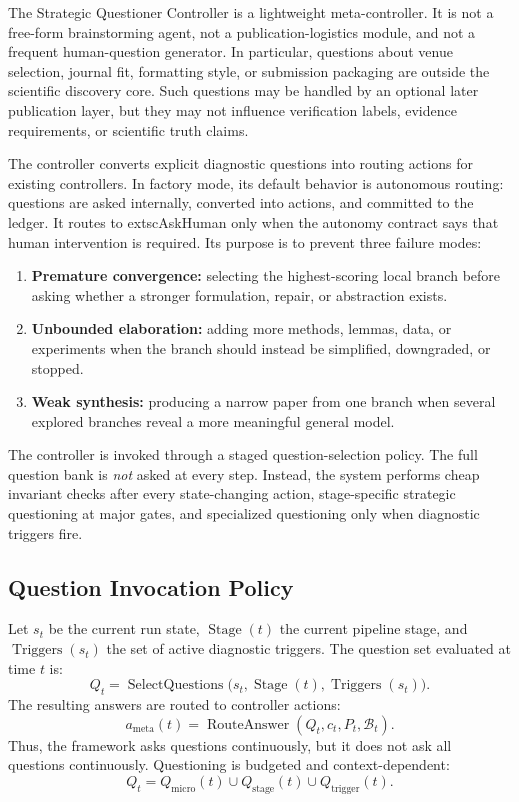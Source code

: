 \documentclass[11pt]{article}
\begin{document}
The Strategic Questioner Controller is a lightweight meta-controller. It is not a free-form brainstorming agent, not a publication-logistics module, and not a frequent human-question generator. In particular, questions about venue selection, journal fit, formatting style, or submission packaging are outside the scientific discovery core. Such questions may be handled by an optional later publication layer, but they may not influence verification labels, evidence requirements, or scientific truth claims.

The controller converts explicit diagnostic questions into routing actions for existing controllers. In factory mode, its default behavior is autonomous routing: questions are asked internally, converted into actions, and committed to the ledger. It routes to 	extsc{AskHuman} only when the autonomy contract says that human intervention is required. Its purpose is to prevent three failure modes:
\begin{enumerate}[leftmargin=*]
    \item \textbf{Premature convergence:} selecting the highest-scoring local branch before asking whether a stronger formulation, repair, or abstraction exists.
    \item \textbf{Unbounded elaboration:} adding more methods, lemmas, data, or experiments when the branch should instead be simplified, downgraded, or stopped.
    \item \textbf{Weak synthesis:} producing a narrow paper from one branch when several explored branches reveal a more meaningful general model.
\end{enumerate}

The controller is invoked through a staged question-selection policy. The full question bank is \emph{not} asked at every step. Instead, the system performs cheap invariant checks after every state-changing action, stage-specific strategic questioning at major gates, and specialized questioning only when diagnostic triggers fire.

\subsection{Question Invocation Policy}

Let $s_t$ be the current run state, $\operatorname{Stage}(t)$ the current pipeline stage, and $\operatorname{Triggers}(s_t)$ the set of active diagnostic triggers. The question set evaluated at time $t$ is:
$$
Q_t = \operatorname{SelectQuestions}\bigl(s_t,\operatorname{Stage}(t),\operatorname{Triggers}(s_t)\bigr).
$$
The resulting answers are routed to controller actions:
$$
a_{\mathrm{meta}}(t)=\operatorname{RouteAnswer}(Q_t,c_t,P_t,\mathcal{B}_t).
$$
Thus, the framework asks questions continuously, but it does not ask all questions continuously. Questioning is budgeted and context-dependent:
$$
Q_t = Q_{\mathrm{micro}}(t)\cup Q_{\mathrm{stage}}(t)\cup Q_{\mathrm{trigger}}(t).
$$
\end{document}
